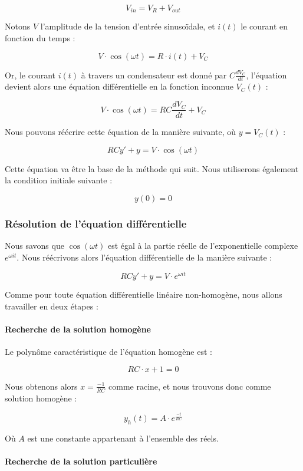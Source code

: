 $$V_{in} = V_R + V_{out}$$

Notons $V$ l'amplitude de la tension d'entrée sinusoïdale, et $i(t)$ le courant
en fonction du temps : 

$$V \cdot \cos (\omega t) = R \cdot i(t) + V_C$$

Or, le courant $i(t)$ à travers un condensateur est donné par $C \frac{dV_C}{dt}$, 
l'équation devient alors une équation différentielle en la fonction inconnue $V_C (t)$ :

$$V \cdot \cos (\omega t) = RC\frac{dV_C}{dt}  + V_C$$

Nous pouvons réécrire cette équation de la manière suivante, où $y = V_C(t)$ :

$$RCy' + y = V \cdot \cos (\omega t)$$

Cette équation va être la base de la méthode qui suit. Nous utiliserons également
la condition initiale suivante :

$$y(0) = 0$$

\subsubsection{Résolution de l'équation différentielle}

Nous savons que $\cos (\omega t)$ est égal à la partie réelle de l'exponentielle
complexe $e^{\omega i t}$. Nous réécrivons alors l'équation différentielle de la
manière suivante :

$$RCy' + y = V \cdot e^{\omega i t}$$

Comme pour toute équation différentielle linéaire non-homogène, nous allons travailler
en deux étapes :

\paragraph{Recherche de la solution homogène}

Le polynôme caractéristique de l'équation homogène est :

$$RC \cdot x + 1 = 0$$

Nous obtenons alors $x = \frac{-1}{RC}$ comme racine, et nous trouvons donc comme solution homogène :

$$y_h(t) = A \cdot e^{\frac{-t}{RC}}$$

Où $A$ est une constante appartenant à l'ensemble des réels. %

\paragraph{Recherche de la solution particulière}

